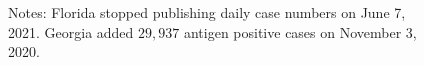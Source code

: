 \documentclass[12pt]{article}
\begin{document}
\begin{figure}[!p]
\begin{center}
\begin{tabular}
{\includegraphics[
height=1.7763in,
width=3.5293in
]%
{figs/US-Re-KS-2W.png}%
}
&
{\includegraphics[
height=1.7763in,
width=3.5293in
]%
{figs/US-Re-KY-2W.png}%
}
\end{tabular}

\end{center}

%

\vspace{-0.4cm}%
\footnotesize
{}Notes: Florida stopped publishing daily case numbers on June 7, 2021.
Georgia added $29,937$ antigen positive cases on November 3, 2020.%

\end{figure}%
%

\addtocounter{figure}{-1}%
%
\end{document}
